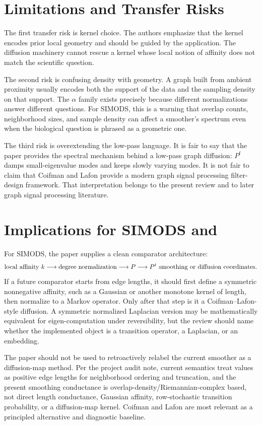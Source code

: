 \documentclass[11pt]{article}
\begin{document}
\section{Limitations and Transfer Risks}

The first transfer risk is kernel choice.  The authors emphasize that the
kernel encodes prior local geometry and should be guided by the application.
The diffusion machinery cannot rescue a kernel whose local notion of affinity
does not match the scientific question.

The second risk is confusing density with geometry.  A graph built from
ambient proximity usually encodes both the support of the data and the
sampling density on that support.  The $\alpha$ family exists precisely
because different normalizations answer different questions.  For SIMODS, this
is a warning that overlap counts, neighborhood sizes, and sample density can
affect a smoother's spectrum even when the biological question is phrased as a
geometric one.

The third risk is overextending the low-pass language.  It is fair to say that
the paper provides the spectral mechanism behind a low-pass graph diffusion:
$P^t$ damps small-eigenvalue modes and keeps slowly varying modes.  It is not
fair to claim that Coifman and Lafon provide a modern graph signal processing
filter-design framework.  That interpretation belongs to the present review
and to later graph signal processing literature.

\section{Implications for SIMODS and }

For SIMODS, the paper supplies a clean comparator architecture:
\[
  \hbox{local affinity } k
  \longrightarrow
  \hbox{degree normalization}
  \longrightarrow
  P
  \longrightarrow
  P^t \hbox{ smoothing or diffusion coordinates}.
\]
If a future comparator starts from edge lengths, it should first define a
symmetric nonnegative affinity, such as a Gaussian or another monotone kernel
of length, then normalize to a Markov operator.  Only after that step is it a
Coifman--Lafon-style diffusion.  A symmetric normalized Laplacian version may
be mathematically equivalent for eigen-computation under reversibility, but
the review should name whether the implemented object is a transition
operator, a Laplacian, or an embedding.

The paper should not be used to retroactively relabel the current
 smoother as a diffusion-map method.  Per the
project audit note, current  semantics treat 
values as positive edge lengths for neighborhood ordering and truncation, and
the present smoothing conductance is overlap-density/Riemannian-complex based,
not direct length conductance, Gaussian affinity, row-stochastic transition
probability, or a diffusion-map kernel.  Coifman and Lafon are most relevant
as a principled alternative and diagnostic baseline.
\end{document}
